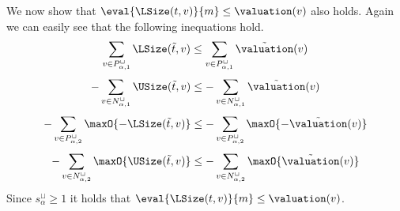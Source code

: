 We now show that $\eval{\LSize(t, v)}{m} \leq \valuation(v)$ also holds.
Again we can easily see that the following inequations hold.
\[ \sum_{v \in P_{\alpha,1}^\sqcup} \LSize(\tilde{t}, v) \leq \sum_{v \in P_{\alpha,1}^\sqcup} \tilde{\valuation}(v) \]
\[ - \sum_{v \in N_{\alpha,1}^\sqcup} \USize(\tilde{t}, v) \leq - \sum_{v \in N_{\alpha,1}^\sqcup} \tilde{\valuation}(v) \]
\[ - \sum_{v \in P_{\alpha,2}^\sqcup} \maxO{-\LSize(\tilde{t}, v)} \leq - \sum_{v \in P_{\alpha,2}^\sqcup} \maxO{-\tilde{\valuation}(v)} \]
\[ - \sum_{v \in N_{\alpha,2}^\sqcup} \maxO{\USize(\tilde{t}, v)} \leq - \sum_{v \in N_{\alpha,2}^\sqcup} \maxO{\tilde{\valuation}(v)} \]
Since $s^\sqcup_\alpha \geq 1$ it holds that $\eval{\LSize(t, v)}{m} \leq \valuation(v)$.

